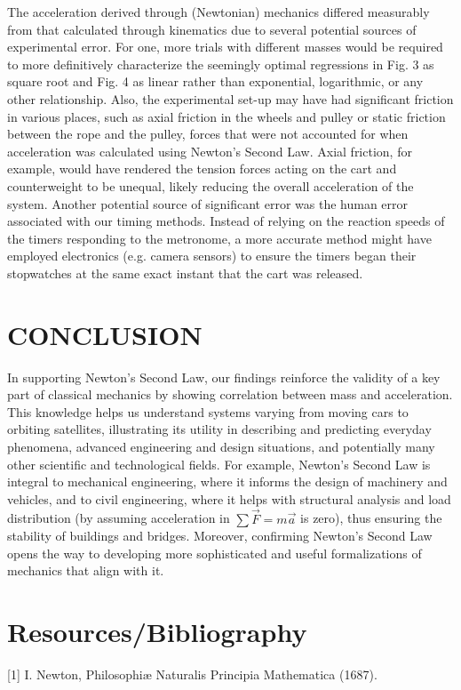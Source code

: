 \documentclass[twocolumn, 10pt]{article}
\begin{document}
\hspace{\parindent} The acceleration derived through (Newtonian) mechanics differed measurably from that calculated through kinematics due to several potential sources of experimental error. For one, more trials with different masses would be required to more definitively characterize the seemingly optimal regressions in Fig. 3 as square root and Fig. 4 as linear rather than exponential, logarithmic, or any other relationship. Also, the experimental set-up may have had significant friction in various places, such as axial friction in the wheels and pulley or static friction between the rope and the pulley, forces that were not accounted for when acceleration was calculated using Newton's Second Law. Axial friction, for example, would have rendered the tension forces acting on the cart and counterweight to be unequal, likely reducing the overall acceleration of the system. Another potential source of significant error was the human error associated with our timing methods. Instead of relying on the reaction speeds of the timers responding to the metronome, a more accurate method might have employed electronics (e.g. camera sensors) to ensure the timers began their stopwatches at the same exact instant that the cart was released.
\section*{CONCLUSION}
\hspace{\parindent}In supporting Newton's Second Law, our findings reinforce the validity of a key part of classical mechanics by showing correlation between mass and acceleration. This knowledge helps us understand systems varying from moving cars to orbiting satellites, illustrating its utility in describing and predicting everyday phenomena, advanced engineering and design situations, and potentially many other scientific and technological fields. For example, Newton's Second Law is integral to mechanical engineering, where it informs the design of machinery and vehicles, and to civil engineering, where it helps with structural analysis and load distribution (by assuming acceleration in $\sum \vec{F}=m\vec{a}$ is zero), thus ensuring the stability of buildings and bridges. Moreover, confirming Newton's Second Law opens the way to developing more sophisticated and useful formalizations of mechanics that align with it.




\section*{Resources/Bibliography}
[1] I. Newton, Philosophiæ Naturalis Principia Mathematica (1687).
\end{document}
